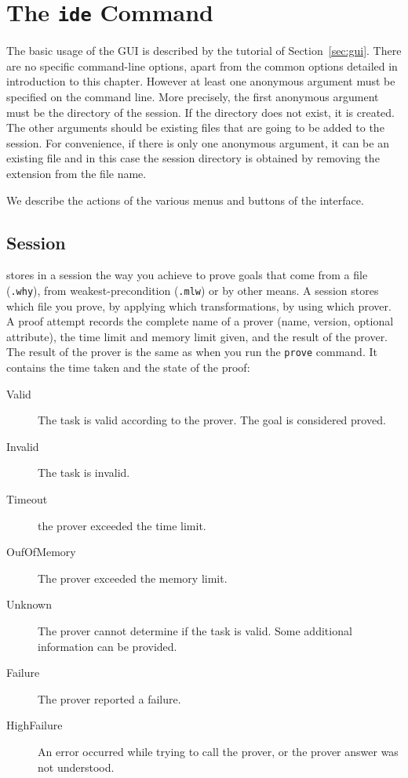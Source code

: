 \section{The \texttt{ide} Command}
\label{sec:ideref}

The basic usage of the GUI is described by the tutorial of
Section~\ref{sec:gui}. There are no specific command-line options,
apart from the common options detailed in introduction to this
chapter. However at least one anonymous argument must be specified on
the command line. More precisely, the first anonymous argument must be
the directory of the session. If the directory does not exist, it is
created. The other arguments should be existing files that are going
to be added to the session. For convenience,
if there is only one anonymous argument, it can be an existing file and
in this case the session directory is obtained by removing the extension
from the file name.

We describe the actions of the various menus and buttons of the
interface.

\subsection{Session}
\label{sec:idref:session}
\why stores in a session the way you achieve to prove goals that come
from a file (\texttt{.why}), from weakest-precondition (\texttt{.mlw}) or by other
means. A session stores which file you prove, by applying which
transformations, by using which prover. A proof attempt records the
complete name of a prover (name, version, optional attribute), the
time limit and memory limit given, and the result of the prover. The
result of the prover is the same as when you run the \texttt{prove} command. It
contains the time taken and the state of the proof:

\begin{description}
\item[Valid] The task is valid according to the prover. The
  goal is considered proved.
\item[Invalid] The task is invalid.
\item[Timeout] the prover exceeded the time limit.
\item[OufOfMemory] The prover exceeded the memory limit.
\item[Unknown] The prover cannot determine if the task
  is valid. Some additional information can be provided.
\item[Failure] The prover reported a failure.
\item[HighFailure] An error occurred while trying to call the
  prover, or the prover answer was not understood.
\end{description}


